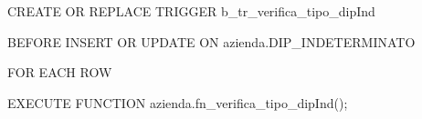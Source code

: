         \ttfamily
            \begin{flushleft}
                \begin{description}
                    \item CREATE OR REPLACE TRIGGER b\_tr\_verifica\_tipo\_dipInd
                    \item BEFORE INSERT OR UPDATE ON azienda.DIP\_INDETERMINATO
                    \item FOR EACH ROW
                    \item EXECUTE FUNCTION azienda.fn\_verifica\_tipo\_dipInd();
                \end{description}
            \end{flushleft}
        \normalfont

        \newpage
        
